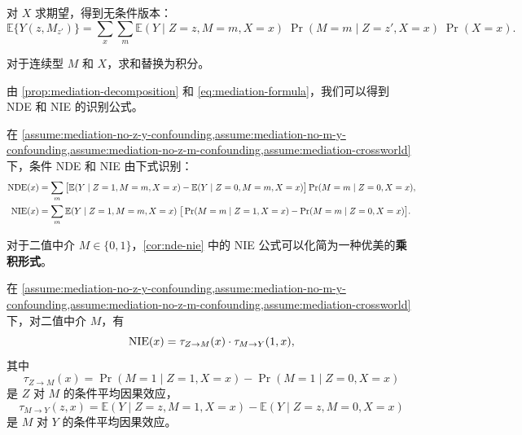 对 $X$ 求期望，得到无条件版本：
\[
\mathbb{E}\{ Y(z, M_{z'}) \}
= \sum_x \sum_m \mathbb{E}(Y \mid Z = z, M = m, X = x) \; \Pr(M = m \mid Z = z', X = x) \; \Pr(X = x).
\]

对于连续型 $M$ 和 $X$，求和替换为积分。

由 \cref{prop:mediation-decomposition} 和 \cref{eq:mediation-formula}，我们可以得到 NDE 和 NIE 的识别公式。

\begin{Corollary}\label{cor:nde-nie}
在 \cref{assume:mediation-no-z-y-confounding,assume:mediation-no-m-y-confounding,assume:mediation-no-z-m-confounding,assume:mediation-crossworld} 下，条件 NDE 和 NIE 由下式识别：
\begin{align}
\mathrm{NDE}(x)
&= \sum_m \big[ \mathbb{E}(Y \mid Z = 1, M = m, X = x) - \mathbb{E}(Y \mid Z = 0, M = m, X = x) \big] \Pr(M = m \mid Z = 0, X = x), \label{eq:nde-formula} \\
\mathrm{NIE}(x)
&= \sum_m \mathbb{E}(Y \mid Z = 1, M = m, X = x) \; \big[ \Pr(M = m \mid Z = 1, X = x) - \Pr(M = m \mid Z = 0, X = x) \big]. \label{eq:nie-formula}
\end{align}
\end{Corollary}

\fboxsep=5pt\fboxrule=1pt
\noindent{}

对于二值中介 $M \in \{0, 1\}$，\cref{cor:nde-nie} 中的 NIE 公式可以化简为一种优美的\textbf{乘积形式}。

\begin{Corollary}\label{cor:nie-binary}
在 \cref{assume:mediation-no-z-y-confounding,assume:mediation-no-m-y-confounding,assume:mediation-no-z-m-confounding,assume:mediation-crossworld} 下，对二值中介 $M$，有
\[
\mathrm{NIE}(x) = \tau_{Z \to M}(x) \cdot \tau_{M \to Y}(1, x),
\]
其中
\[
\tau_{Z \to M}(x) = \Pr(M = 1 \mid Z = 1, X = x) - \Pr(M = 1 \mid Z = 0, X = x)
\]
是 $Z$ 对 $M$ 的条件平均因果效应，
\[
\tau_{M \to Y}(z, x) = \mathbb{E}(Y \mid Z = z, M = 1, X = x) - \mathbb{E}(Y \mid Z = z, M = 0, X = x)
\]
是 $M$ 对 $Y$ 的条件平均因果效应。
\end{Corollary}

